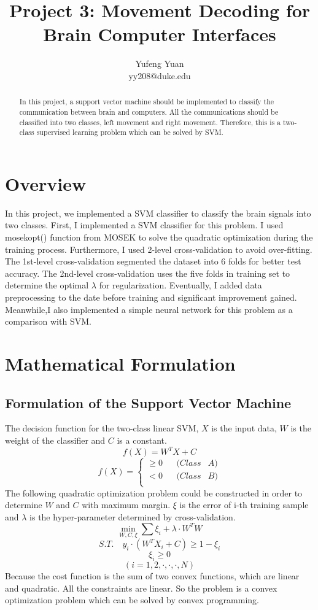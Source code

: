 \documentclass{article}
\title{Project 3: Movement Decoding for Brain Computer Interfaces}
\author{Yufeng Yuan\\ 
yy208@duke.edu}
\begin{document}
\maketitle

\begin{abstract}
In this project, a support vector machine should be implemented to classify the communication between brain and computers. All the communications should be classified into two classes, left movement and right movement. Therefore, this is a two-class supervised learning problem which can be solved by SVM.

\end{abstract}

\section{Overview}
In this project, we implemented a SVM classifier to classify the brain signals into two classes.
First, I implemented a SVM classifier for this problem. I used mosekopt() function from MOSEK to solve the quadratic optimization during the training process.
Furthermore, I used 2-level cross-validation to avoid over-fitting. The 1st-level cross-validation segmented the dataset into 6 folds for better test accuracy. The 2nd-level cross-validation uses the five folds in training set to determine the optimal $ \lambda $ for regularization.
Eventually, I added data preprocessing to the date before training and significant improvement gained. Meanwhile,I also implemented a simple neural network for this problem as a comparison with SVM.

\section{Mathematical Formulation}

\subsection{Formulation of the Support Vector Machine}
The decision function for the two-class linear SVM, $X$ is the input data, $W$ is the weight of the classifier and $C$ is a constant.
$$
f(X)=W^TX+C
$$
$$
f(X)=\left\{
\begin{aligned}
\ge 0 && (Class & A) \\
< 0 && (Class & B) \\
\end{aligned}
\right.
$$
The following quadratic optimization problem could be constructed in order to determine $W$ and $C$ with maximum margin. $\xi$ is the error of i-th training sample and $\lambda$ is the hyper-parameter determined by cross-validation.
$$
\min_{W,C,\xi} \sum \xi_i + \lambda \cdot W^TW
$$
$$
S.T. \quad y_i \cdot (W^TX_i+C) \ge 1 - \xi_i
$$
$$
\xi_i \ge 0
$$
$$
(i=1,2,\cdot, \cdot, \cdot, N)
$$
Because the cost function is the sum of two convex functions, which are linear and quadratic. All the constraints are linear. So the problem is a convex optimization problem which can be solved by convex programming.
\end{document}
